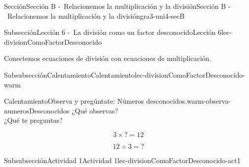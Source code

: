 \documentclass[twoside,10pt,]{article}
\begin{document}
%
%
\typeout{************************************************}
\typeout{************************************************}
%
\begin{sectionptx}{Sección}{Sección B -~Relacionemos la multiplicación y la división}{}{Sección B -~Relacionemos la multiplicación y la división}{}{}{gra3-uni4-secB}
%
%
\typeout{************************************************}
\typeout{************************************************}
%
\begin{subsectionptx}{Subsección}{Lección 6 -~La división como un factor desconocido}{}{Lección 6}{}{}{lec-divisionComoFactorDesconocido}
\begin{introduction}{}%
Conectemos ecuaciones de división con ecuaciones de multiplicación.%
\end{introduction}%
%
%
\typeout{************************************************}
\typeout{************************************************}
%
\begin{subsubsectionptx}{Subsubsección}{Calentamiento}{}{Calentamiento}{}{}{lec-divisionComoFactorDesconocido-warm}
\begin{exploration}{Calentamiento}{Observa y pregúntate: Números desconocidos.}{warm-observa-numerosDesconocidos}%
¿Qué observas?\\
 ¿Qué te preguntas?%
\begin{sidebyside}{2}{0}{0}{0}%
\begin{sbspanel}{0.5}%
%
\begin{equation*}
3\times {?} =12
\end{equation*}
%
\end{sbspanel}%
\begin{sbspanel}{0.5}%
\par
%
\begin{equation*}
12\div 3 ={?}
\end{equation*}
%
\end{sbspanel}%
\end{sidebyside}%
\end{exploration}%
\end{subsubsectionptx}
%
%
\typeout{************************************************}
\typeout{************************************************}
%
\begin{subsubsectionptx}{Subsubsección}{Actividad 1}{}{Actividad 1}{}{}{lec-divisionComoFactorDesconocido-act1}

\end{subsubsectionptx}
\end{subsectionptx}
\end{sectionptx}
\end{document}
